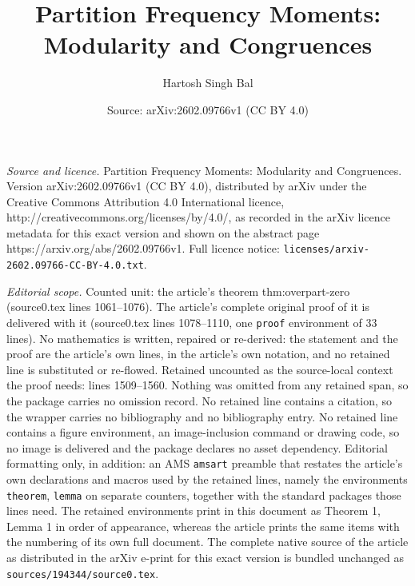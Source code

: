 \documentclass[10pt,a4paper]{amsart}
\title{Partition Frequency Moments: Modularity and Congruences}
\author{Hartosh Singh Bal}
\date{Source: arXiv:2602.09766v1 (CC BY 4.0)}
\begin{document}
\maketitle

\noindent\emph{Source and licence.} Partition Frequency Moments: Modularity and Congruences. Version arXiv:2602.09766v1 (CC BY 4.0), distributed by arXiv under the Creative Commons Attribution 4.0 International licence, http://creativecommons.org/licenses/by/4.0/, as recorded in the arXiv licence metadata for this exact version and shown on the abstract page https://arxiv.org/abs/2602.09766v1. Full licence notice: \texttt{licenses/arxiv-2602.09766-CC-BY-4.0.txt}.\par\smallskip

\noindent\textit{Editorial scope.} Counted unit: the article's theorem thm:overpart-zero (source0.tex lines 1061--1076). The article's complete original proof of it is delivered with it (source0.tex lines 1078--1110, one \texttt{proof} environment of 33 lines). No mathematics is written, repaired or re-derived: the statement and the proof are the article's own lines, in the article's own notation, and no retained line is substituted or re-flowed.  Retained uncounted as the source-local context the proof needs: lines 1509--1560.  Nothing was omitted from any retained span, so the package carries no omission record.  No retained line contains a citation, so the wrapper carries no bibliography and no bibliography entry.  No retained line contains a figure environment, an image-inclusion command or drawing code, so no image is delivered and the package declares no asset dependency.  Editorial formatting only, in addition: an AMS \texttt{amsart} preamble that restates the article's own declarations and macros used by the retained lines, namely the environments \texttt{theorem}, \texttt{lemma} on separate counters, together with the standard packages those lines need.  The retained environments print in this document as Theorem 1, Lemma 1 in order of appearance, whereas the article prints the same items with the numbering of its own full document.  The complete native source of the article as distributed in the arXiv e-print for this exact version is bundled unchanged as \texttt{sources/194344/source0.tex}.
\end{document}
